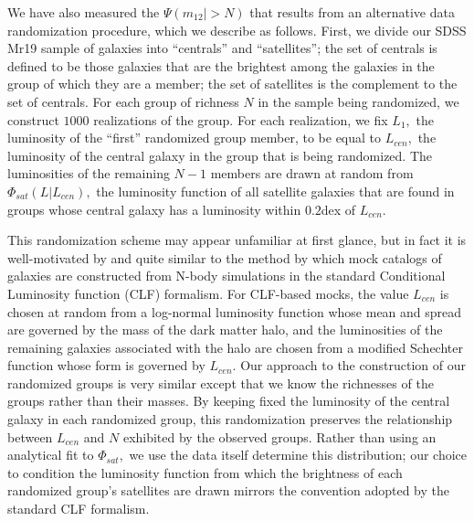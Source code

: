 \documentclass[usenatbib,usegraphicx,letterpaper]{mn2e}
\newcommand{\monetwo}{m_{12}}
\begin{document}
We have also measured the $\Psi(\monetwo|> N)$ that results from 
an alternative data randomization procedure, which we describe as follows. 
First, we divide our SDSS Mr19 sample of galaxies into ``centrals'' and ``satellites''; 
the set of centrals is defined to be those galaxies that are the brightest among 
the galaxies in the group of which they are a member; the set of satellites is 
the complement to the set of centrals. For each group of richness $N$ in the 
sample being randomized, we construct $1000$ realizations of the group. For each 
realization, we fix $L_1,$ the luminosity of the ``first'' randomized group member, 
to be equal to $L_{cen},$ the luminosity of the central galaxy in the group that 
is being randomized. The luminosities of the remaining $N-1$ members are drawn 
at random from $\Phi_{sat}(L|L_{cen}),$ the luminosity function of all satellite 
galaxies that are found in groups whose central galaxy has a luminosity within $0.2$dex of $L_{cen}.$

This randomization scheme may appear unfamiliar at first glance, but in fact 
it is well-motivated by and quite similar to the method by which mock catalogs of 
galaxies are constructed from N-body simulations in the standard Conditional Luminosity 
function (CLF) formalism. For CLF-based mocks, the value $L_{cen}$ is chosen at random from 
a log-normal luminosity function whose mean and spread are governed by the mass of the 
dark matter halo, and the luminosities of the remaining galaxies associated with the halo 
are chosen from a modified Schechter function whose form is governed by $L_{cen}.$ Our approach 
to the construction of our randomized groups is very similar except that we know the richnesses 
of the groups rather than their masses. By keeping fixed the luminosity of the central galaxy 
in each randomized group, this randomization preserves the relationship between $L_{cen}$ and $N$ 
exhibited by the observed groups. Rather than using an analytical fit to $\Phi_{sat},$ we 
use the data itself determine this distribution; our choice to condition the luminosity 
function from which the brightness of each randomized group's satellites are drawn 
mirrors the convention adopted by the standard CLF formalism. 
\end{document}
